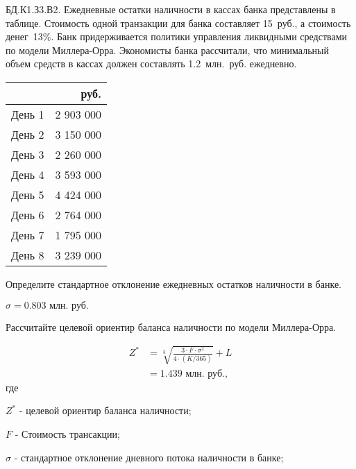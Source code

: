 \documentclass[12pt, table]{exam}
\begin{document}
\begin{questions}
\begin{subparts}
\end{subparts}
\addpoints

\question[20] БД.К1.З3.В2. Ежедневные остатки наличности в кассах банка представлены в таблице. Стоимость одной транзакции для банка составляет 15~руб., а стоимость денег~13\%. Банк придерживается политики управления ликвидными средствами по модели Миллера-Орра. Экономисты банка рассчитали, что минимальный объем средств в кассах должен составлять 1.2~млн.~руб. ежедневно.
\begin{table}[htbp]
	\centering
	\begin{tabular}{lr}
		& руб.\\
		\toprule
	    День 1  &      2 903 000    \\
		День 2  &      3 150 000    \\
		День 3  &      2 260 000    \\
		День 4  &      3 593 000    \\
		День 5  &      4 424 000    \\
		День 6  &      2 764 000    \\
		День 7  &      1 795 000    \\
		День 8  &      3 239 000    \\
		\bottomrule
	\end{tabular}%
	\label{tab:addlabel}%
\end{table}%

\noaddpoints

\begin{subparts}
	\subpart[5] Определите стандартное отклонение ежедневных остатков наличности в банке.
	
	\begin{solution}[6em]
		$\sigma=0.803\text{~млн.~руб.}$
	\end{solution}
	
	\subpart[5] Рассчитайте целевой ориентир баланса наличности по модели Миллера-Орра.	
	\begin{solution}[6em]
		
		\begin{align}
		Z^*&=\sqrt[3]{\frac{3 \cdot F \cdot \sigma^2}{4 \cdot (K/365)}}+L\\
		&=1.439\text{~млн.~руб.},\nonumber
		\end{align}
		где
		
		$Z^*$ - целевой ориентир баланса наличности;
		
		$F$ - Стоимость трансакции;
		
		$\sigma$ - стандартное отклонение дневного потока наличности в банке;
		

\end{solution}
\end{subparts}
\end{questions}
\end{document}
